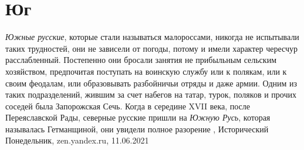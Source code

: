  
 
 
 
 
\chapter{Юг}
\label{sec:slova.jug}

\emph{Южные русские}, которые стали называться малороссами, никогда не
испытывали таких трудностей, они не зависели от погоды, потому и имели характер
чересчур расслабленный. Постепенно они бросали занятия не прибыльным сельским
хозяйством, предпочитая поступать на воинскую службу или к полякам, или к своим
феодалам, или образовывать разбойничьи отряды и даже армии. Одним из таких
подразделений, жившим за счет набегов на татар, турок, поляков и прочих соседей
была Запорожская Сечь. Когда в середине XVII века, после Переяславской Рады,
северные русские пришли на \emph{Южную Русь}, которая называлась Гетманщиной,
они увидели полное разорение
, 
Исторический Понедельник, zen.yandex.ru, 11.06.2021

